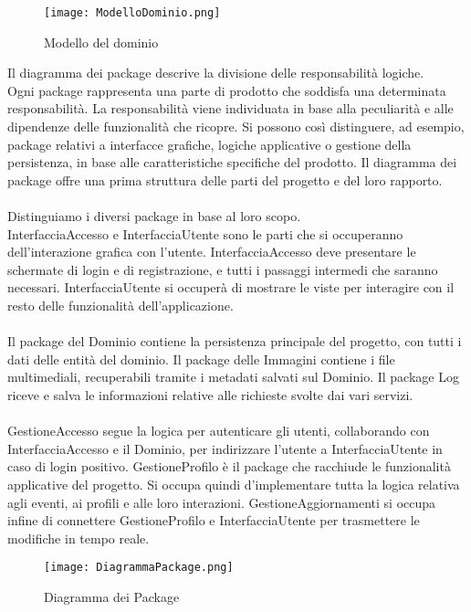 \begin{figure}[h!]
    \begin{center}
        \texttt{[image: ModelloDominio.png]}
        \caption{Modello del dominio}
    \end{center}
\end{figure}

Il diagramma dei package descrive la divisione delle responsabilità logiche.\\
Ogni package rappresenta una parte di prodotto che soddisfa una determinata responsabilità. 
La responsabilità viene individuata in base alla peculiarità e 
alle dipendenze delle funzionalità che ricopre.
Si possono così distinguere, ad esempio, package relativi a interfacce grafiche, logiche applicative o gestione della persistenza, 
in base alle caratteristiche specifiche del prodotto.
Il diagramma dei package offre una prima struttura delle parti del progetto e del loro rapporto.\\
\\
Distinguiamo i diversi package in base al loro scopo.\\
InterfacciaAccesso e InterfacciaUtente sono le parti che si occuperanno dell'interazione grafica con l'utente.
InterfacciaAccesso deve presentare le schermate di login e di registrazione,
e tutti i passaggi intermedi che saranno necessari.
InterfacciaUtente si occuperà di mostrare le viste per interagire con il resto delle funzionalità dell'applicazione.\\
\\
Il package del Dominio contiene la persistenza principale del progetto,
con tutti i dati delle entità del dominio.
Il package delle Immagini contiene i file multimediali,
recuperabili tramite i metadati salvati sul Dominio.
Il package Log riceve e salva le informazioni relative alle richieste svolte dai vari servizi.\\
\\
GestioneAccesso segue la logica per autenticare gli utenti, 
collaborando con InterfacciaAccesso e il Dominio, 
per indirizzare l'utente a InterfacciaUtente in caso di login positivo.
GestioneProfilo è il package che racchiude le funzionalità applicative del progetto.
Si occupa quindi d'implementare tutta la logica relativa agli eventi, ai profili e alle loro interazioni.
GestioneAggiornamenti si occupa infine di connettere GestioneProfilo e InterfacciaUtente 
per trasmettere le modifiche in tempo reale.\\

\begin{figure}[h!]
    \begin{center}
        \texttt{[image: DiagrammaPackage.png]}
        \caption{Diagramma dei Package}
    \end{center}
\end{figure}
\clearpage

